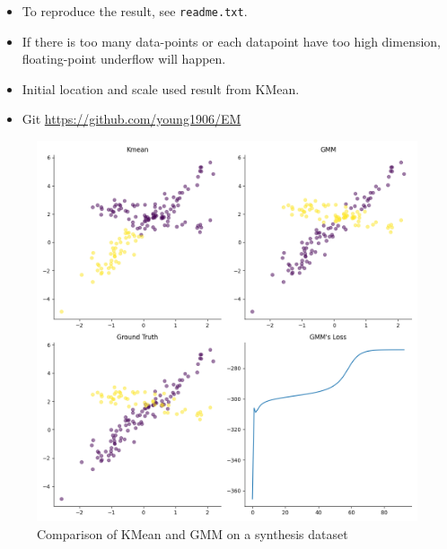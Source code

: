 \begin{itemize}
	\item To reproduce the result, see \texttt{readme.txt}.
	\item If there is too many data-points or each datapoint have too high dimension, floating-point underflow will happen.
	\item Initial location and scale used result from KMean.
	\item Git \url{https://github.com/young1906/EM}
\end{itemize}


\begin{figure}[h]
	\centering
	\includegraphics[width=12cm]{../sample.png}
	\caption{Comparison of KMean and GMM on a synthesis dataset}
\end{figure}
